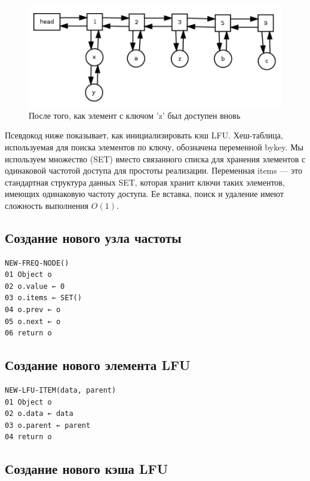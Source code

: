 \documentclass[a4paper, 12pt]{article}
\begin{document}
\begin{figure}[ht!]
    \begin{center}
        \includegraphics{after_k.png}
    \end{center}
    \caption{После того, как элемент с ключом 'z' был доступен вновь}
\end{figure}

Псевдокод ниже показывает, как инициализировать кэш LFU. Хеш-таблица, используемая для поиска элементов по ключу, обозначена переменной bykey. Мы используем множество (SET) вместо связанного списка для хранения элементов с одинаковой частотой доступа для простоты реализации. Переменная items — это стандартная структура данных SET, которая хранит ключи таких элементов, имеющих одинаковую частоту доступа. Ее вставка, поиск и удаление имеют сложность выполнения $O(1)$.

\newpage

\subsection*{Создание нового узла частоты}

\begin{verbatim}
NEW-FREQ-NODE()
01 Object o
02 o.value ← 0
03 o.items ← SET()
04 o.prev ← o
05 o.next ← o
06 return o
\end{verbatim}

\subsection*{Создание нового элемента LFU}

\begin{verbatim}
NEW-LFU-ITEM(data, parent)
01 Object o
02 o.data ← data
03 o.parent ← parent
04 return o
\end{verbatim}

\subsection*{Создание нового кэша LFU}
\end{document}
